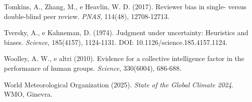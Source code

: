 Tomkins, A., Zhang, M., e Heavlin, W. D. (2017). Reviewer bias in single- versus double-blind peer review. \textit{PNAS}, 114(48), 12708-12713.

Tversky, A., e Kahneman, D. (1974). Judgment under uncertainty: Heuristics and biases. \textit{Science}, 185(4157), 1124-1131. DOI: 10.1126/science.185.4157.1124.

Woolley, A. W., e altri (2010). Evidence for a collective intelligence factor in the performance of human groups. \textit{Science}, 330(6004), 686-688.

World Meteorological Organization (2025). \textit{State of the Global Climate 2024}. WMO, Ginevra.

\endgroup
